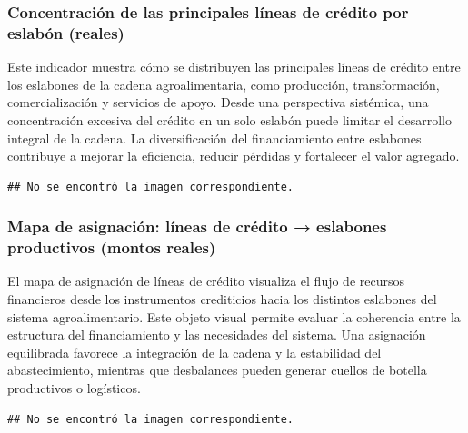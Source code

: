 \documentclass[
]{article}
\begin{document}
\subsubsection{Concentración de las principales líneas de crédito por
eslabón
(reales)}\label{concentraciuxf3n-de-las-principales-luxedneas-de-cruxe9dito-por-eslabuxf3n-reales}

Este indicador muestra cómo se distribuyen las principales líneas de
crédito entre los eslabones de la cadena agroalimentaria, como
producción, transformación, comercialización y servicios de apoyo. Desde
una perspectiva sistémica, una concentración excesiva del crédito en un
solo eslabón puede limitar el desarrollo integral de la cadena. La
diversificación del financiamiento entre eslabones contribuye a mejorar
la eficiencia, reducir pérdidas y fortalecer el valor agregado.

\begin{verbatim}
## No se encontró la imagen correspondiente.
\end{verbatim}

\subsubsection{Mapa de asignación: líneas de crédito → eslabones
productivos (montos
reales)}\label{mapa-de-asignaciuxf3n-luxedneas-de-cruxe9dito-eslabones-productivos-montos-reales}

El mapa de asignación de líneas de crédito visualiza el flujo de
recursos financieros desde los instrumentos crediticios hacia los
distintos eslabones del sistema agroalimentario. Este objeto visual
permite evaluar la coherencia entre la estructura del financiamiento y
las necesidades del sistema. Una asignación equilibrada favorece la
integración de la cadena y la estabilidad del abastecimiento, mientras
que desbalances pueden generar cuellos de botella productivos o
logísticos.

\begin{verbatim}
## No se encontró la imagen correspondiente.
\end{verbatim}
\end{document}
